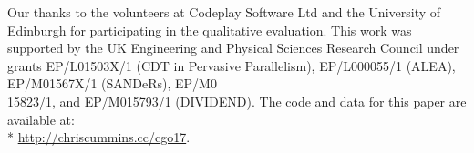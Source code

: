 \acks
Our thanks to the volunteers at Codeplay Software Ltd and the University of
Edinburgh for participating in the qualitative evaluation. This work was supported by the UK Engineering and Physical Sciences Research Council under grants EP/L01503X/1 (CDT in Pervasive Parallelism), EP/L000055/1 (ALEA), EP/M01567X/1 (SANDeRs), EP/M0\\15823/1, and EP/M015793/1 (DIVIDEND).
The code and data for this paper are available at:\\*
\noindent \url{http://chriscummins.cc/cgo17}.